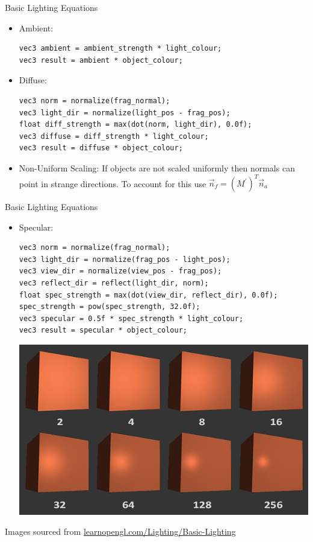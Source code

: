 \documentclass{beamer}
\begin{document}
\begin{frame}[fragile]{Basic Lighting Equations}
    \begin{itemize}
        \item Ambient:
\footnotesize{
\begin{verbatim}
vec3 ambient = ambient_strength * light_colour;
vec3 result = ambient * object_colour;
\end{verbatim}
}
        \item Diffuse: 
\footnotesize{
\begin{verbatim}
vec3 norm = normalize(frag_normal);
vec3 light_dir = normalize(light_pos - frag_pos);
float diff_strength = max(dot(norm, light_dir), 0.0f);
vec3 diffuse = diff_strength * light_colour;
vec3 result = diffuse * object_colour;
\end{verbatim}
}
        \item Non-Uniform Scaling: If objects are not scaled uniformly then normals can 
            point in strange directions. To account for this use
            $\vec{n}_{f} = \left(M^{'}\right)^{T}\vec{n}_{a}$
    \end{itemize}
\end{frame}

\begin{frame}[fragile]{Basic Lighting Equations}
    \begin{itemize}
        \item Specular: 
\footnotesize{
\begin{verbatim}
vec3 norm = normalize(frag_normal);
vec3 light_dir = normalize(frag_pos - light_pos);
vec3 view_dir = normalize(view_pos - frag_pos);
vec3 reflect_dir = reflect(light_dir, norm);
float spec_strength = max(dot(view_dir, reflect_dir), 0.0f);
spec_strength = pow(spec_strength, 32.0f);
vec3 specular = 0.5f * spec_strength * light_colour;
vec3 result = specular * object_colour;
\end{verbatim}
}
        \begin{center}
            \includegraphics[height=0.30\textheight]{images/specular_shininess.png}
        \end{center}
    \end{itemize}
    \vfill{}
    {\footnotesize{Images sourced from \url{learnopengl.com/Lighting/Basic-Lighting}}}
\end{frame}
\end{document}
